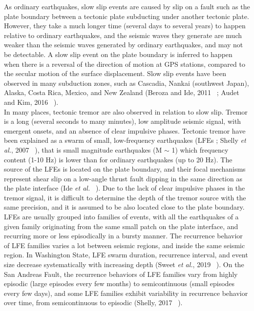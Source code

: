 \documentclass[letterpaper, 12pt]{article}
\begin{document}
As ordinary earthquakes, slow slip events are caused by slip on a fault such as the plate boundary between a tectonic plate subducting under another tectonic plate. However, they take a much longer time (several days to several years) to happen relative to ordinary earthquakes, and the seismic waves they generate are much weaker than the seismic waves generated by ordinary earthquakes, and may not be detectable. A slow slip event on the plate boundary is inferred to happen when there is a reversal of the direction of motion at GPS stations, compared to the secular motion of the surface displacement. Slow slip events have been observed in many subduction zones, such as Cascadia, Nankai (southwest Japan), Alaska, Costa Rica, Mexico, and New Zealand (Beroza and Ide, 2011 ~\cite{BER_2011}; Audet and Kim, 2016 ~\cite{AUD_2016}). \\

In many places, tectonic tremor are also observed in relation to slow slip. Tremor is a long (several seconds to many minutes), low amplitude seismic signal, with emergent onsets, and an absence of clear impulsive phases. Tectonic tremor have been explained as a swarm of small, low-frequency earthquakes (LFEs ; Shelly \textit{et al.}, 2007 ~\cite{SHE_2007_nature}), that is small magnitude earthquakes (M $\sim$ 1) which frequency content (1-10 Hz) is lower than for ordinary earthquakes (up to 20 Hz). The source of the LFEs is located on the plate boundary, and their focal mechanisms represent shear slip on a low-angle thrust fault dipping in the same direction as the plate interface (Ide \textit{et al.} ~\cite{IDE_2007_GRL}). Due to the lack of clear impulsive phases in the tremor signal, it is difficult to determine the depth of the tremor source with the same precision, and it is assumed to be also located close to the plate boundary. \\

LFEs are usually grouped into families of events, with all the earthquakes of a given family originating from the same small patch on the plate interface, and recurring more or less episodically in a bursty manner. The recurrence behavior of LFE families varies a lot between seismic regions, and inside the same seismic region. In Washington State, LFE swarm duration, recurrence interval, and event size decrease systematically with increasing depth (Sweet \textit{et al.}, 2019 ~\cite{SWE_2019}). On the San Andreas Fault, the recurrence behaviors of LFE families vary from highly episodic (large episodes every few months) to semicontinuous (small episodes every few days), and some LFE families exhibit variability in recurrence behavior over time, from semicontinuous to episodic (Shelly, 2017 ~\cite{SHE_2017}). \\
\end{document}
